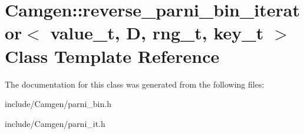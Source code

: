 \hypertarget{a00467}{\section{Camgen\-:\-:reverse\-\_\-parni\-\_\-bin\-\_\-iterator$<$ value\-\_\-t, D, rng\-\_\-t, key\-\_\-t $>$ Class Template Reference}
\label{a00467}
}


The documentation for this class was generated from the following files\-:\begin{DoxyCompactItemize}
\item 
include/\-Camgen/parni\-\_\-bin.\-h\item 
include/\-Camgen/parni\-\_\-it.\-h\end{DoxyCompactItemize}
